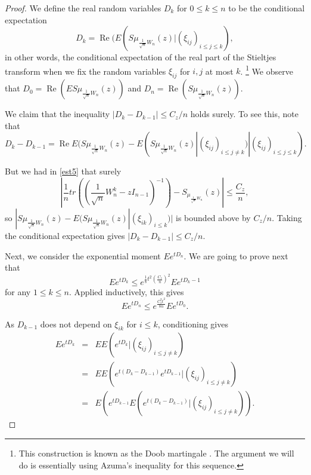 \documentclass[12pt,a4paper,leqno]{report}
\renewcommand{\Re}{\operatorname{Re}}
\theoremstyle{plain}
\theoremstyle{definition}
\theoremstyle{remark}
\begin{document}
\begin{proof}
We define the real random variables $D_k$ for $0\leq k \leq n$ to be the conditional expectation
\begin{equation*}
D_k = \Re(E(S\mu_{\frac{1}{\sqrt{n}}W_n}(z)|(\xi_{ij})_{i \leq j\leq k}),
\end{equation*}
in other words, the conditional expectation of the real part of the Stieltjes transform when we fix the random variables $\xi_{ij}$ for $i,j$ at most $k$. \footnote{This construction is known as the Doob martingale \cite{Doob}. The argument we will do is essentially using Azuma's inequality \cite{Azu} for this sequence.} We observe that $D_0 = \Re(ES\mu_{\frac{1}{\sqrt{n}}W_n}(z))$ and $D_n = \Re(S\mu_{\frac{1}{\sqrt{n}}W_n}(z))$.

We claim that the inequality $|D_k-D_{k-1}|\leq C_z/n$ holds surely. To see this, note that
\begin{equation*}
D_k-D_{k-1} = \Re E(S\mu_{\frac{1}{\sqrt{n}}W_n}(z) - E(S\mu_{\frac{1}{\sqrt{n}}W_n}(z) | (\xi_{ij})_{i \leq j \neq k}) |(\xi_{ij})_{i \leq j\leq k}).
\end{equation*}

But we had in \ref{est5} that surely 
\begin{equation*}
|\frac{1}{n}tr((\frac{1}{\sqrt{n}}W_n^k-zI_{n-1})^{-1}) - S_{\mu_{\frac{1}{\sqrt{n}}W_n}}(z)| \leq \frac{C_z}{n},
\end{equation*}
so $|S\mu_{\frac{1}{\sqrt{n}}W_n}(z) - E(S\mu_{\frac{1}{\sqrt{n}}W_n}(z)| (\xi_{ik})_{i\leq k})|$ is bounded above by $C_z/n$. Taking the conditional expectation gives $|D_k-D_{k-1}|\leq C_z/n$.

Next, we consider the exponential moment $Ee^{tD_n}$.
We are going to prove next that
\begin{equation*}
Ee^{tD_k} \leq e^{\frac{1}{8}t^2\left(\frac{C_z}{n}\right)^2} Ee^{tD_k-1}
\end{equation*}
for any $1\leq k \leq n$. Applied inductively, this gives
\begin{equation*}
Ee^{tD_n} \leq e^{\frac{C_z^2t^2}{8n}} Ee^{tD_0}.
\end{equation*}

As $D_{k-1}$ does not depend on $\xi_{ik}$ for $i\leq k$, conditioning gives
\begin{eqnarray*}
Ee^{tD_k} & = & EE(e^{tD_k}|(\xi_{ij})_{i\leq j \neq k})\\
& = & EE(e^{t(D_k-D_{k-1})}e^{tD_{k-1}}|(\xi_{ij})_{i\leq j \neq k})\\
& = & E(e^{tD_{k-1}}E(e^{t(D_k-D_{k-1})}|(\xi_{ij})_{i\leq j \neq k})).
\end{eqnarray*}


\end{proof}
\end{document}
